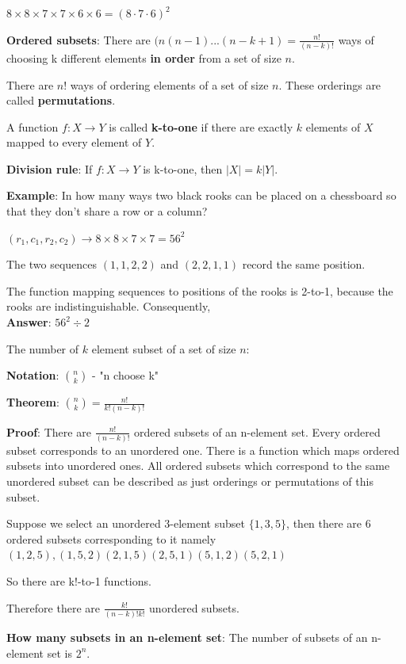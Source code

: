 \documentclass[9pt, letterpaper, oneside]{article}
\begin{document}
$8 \times 8 \times 7 \times 7 \times 6 \times 6 = (8 \cdot 7 \cdot 6)^2$

\textbf{Ordered subsets}: There are $(n(n-1)...(n-k+1) = \frac{n!}{(n-k)!}$ ways of choosing k different elements \textbf{in order} from a set of size $n$.

There are $n!$ ways of ordering elements of a set of size $n$.  These orderings are called \textbf{permutations}.

A function $f: X \to Y$ is called \textbf{k-to-one} if there are exactly $k$ elements of $X$ mapped to every element of $Y$.

\textbf{Division rule}: If $f: X \to Y$ is k-to-one, then $|X| = k|Y|$.

\textbf{Example}: In how many ways two black rooks can be placed on a chessboard so that they don't share a row or a column?

$(r_1, c_1, r_2, c_2) \to 8 \times 8 \times 7 \times 7 = 56^2$ 

The two sequences $(1,1,2,2)$ and $(2,2,1,1)$ record the same position. 

The function mapping sequences to positions of the rooks is 2-to-1, because the rooks are indistinguishable. Consequently,\\
\textbf{Answer}: $56^2 \div 2$

The number of $k$ element subset of a set of size $n$:

\textbf{Notation}: ${n \choose k}$ - "n choose k"

\textbf{Theorem}: ${n \choose k} = \frac{n!}{k!(n-k)!}$ 

\textbf{Proof}: There are $\frac{n!}{(n-k)!}$ ordered subsets of an n-element set. Every ordered subset corresponds to an unordered one. There is a function which maps ordered subsets into unordered ones.
All ordered subsets which correspond to the same unordered subset can be described as just orderings or permutations of this subset.

Suppose we select an unordered 3-element subset $\{1,3,5\}$, then there are 6 ordered subsets corresponding to it namely $(1,2,5), (1,5,2) (2,1,5) (2,5,1) (5, 1, 2) (5,2,1)$

So there are k!-to-1 functions.

Therefore there are $\frac{k!}{(n-k)!k!}$ unordered subsets.

\textbf{How many subsets in an n-element set}: The number of subsets of an n-element set is $2^n$. %
\end{document}
